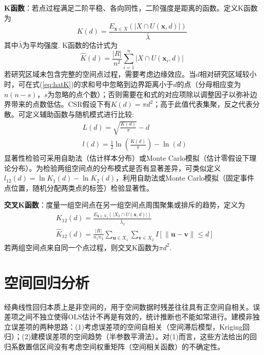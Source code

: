 \par \textbf{K函数}：若点过程满足二阶平稳、各向同性，二阶强度是距离的函数。定义K函数为
\begin{equation}
    K(d)=\frac{E_{\mathbf{x}\in X}(\vert X\cap U(\mathbf{x},d)\vert )}{\bar{\lambda}}
\end{equation}
其中$\bar{\lambda}$为平均强度. K函数的估计式为
\begin{equation}
    \hat{K}(d)=\frac{\vert R \vert}{n^2}\sum_{i=1}^n \vert X\cap U(\mathbf{x}_i,d)\vert
    \label{eq:hatK}
\end{equation}
若研究区域未包含完整的空间点过程，需要考虑边缘效应。当$d$相对研究区域较小时，可在式(\ref{eq:hatK})的求和号中忽略到边界距离小于$d$的点（分母相应变为$n(n-s)$，$s$为忽略的点个数）；否则需要在和式的对应项除以调整因子以弥补边界带来的点数低估。CSR假设下有$K(d)=\pi d^2$；高于此值代表集聚，反之代表分散。可定义辅助函数与随机模式进行比较:
\begin{align}
    &L(d)=\sqrt{\frac{K(d)}{\pi}}-d\\
    &l(d)=\frac{1}{2}\ln\left(\frac{K(d)}{\pi}\right)-\ln(d)
\end{align}
显著性检验可采用自助法（估计样本分布）或Monte Carlo模拟（估计零假设下理论分布）。为检验两组空间点的分布模式是否有显著差异，可类似定义$l_{12}(d)=\ln K_1(d)-\ln K_2(d)$，利用自助法或Monte Carlo模拟（固定事件点位置，随机分配两类点的标签）检验显著性。

\par \textbf{交叉K函数}：度量一组空间点在另一组空间点周围聚集或排斥的趋势，定义为
\begin{align}
    &K_{12}(d)=\frac{E_{\mathbf{x}\in X_1}(\vert X_2\cap U(\mathbf{x},d)\vert )}{\bar{\lambda}_2}\\
    &\hat{K}_{12}(d)=\frac{\vert R \vert}{n_1n_2}\sum_{\mathbf{u}\in X_1}\sum_{\mathbf{v}\in X_2} I[\|\mathbf{u}-\mathbf{v}\|\le d]
\end{align}
若两组空间点来自同一个点过程，则交叉K函数为$\pi d^2$.

\section{空间回归分析}

\par 经典线性回归本质上是非空间的，用于空间数据时残差往往具有正空间自相关。误差项之间不独立使得OLS估计不再是有效的，统计推断也不能如常进行。建模非独立误差项的两种思路：(1)考虑误差项的空间自相关（空间滞后模型，Kriging回归）；(2)建模误差项的空间趋势（半参数平滑法）。对(1)而言，这些方法给出的回归系数置信区间没有考虑空间权重矩阵（空间相关函数）的不确定性。

